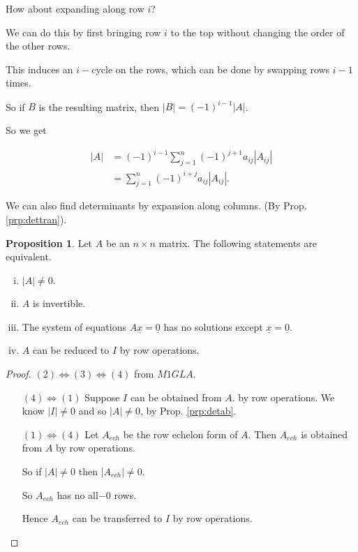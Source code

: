 \documentclass{article}
\theoremstyle{definition} \newtheorem*{definition}{Definition}
\newtheorem{proposition}[theorem]{Proposition}
\begin{document}
   How about expanding along row $i$?

   We can do this by first bringing row $i$ to the top without changing the
   order of the other rows.

   This induces an $i-$cycle on the rows, which can be done by swapping
   rows $i-1$ times.

   So if $B$ is the resulting matrix, then $|B|=(-1)^{i-1}|A|$.

   So we get

   \begin{align*}
     |A| &= (-1)^{i-1} \sum_{j=1}^n (-1)^{j+1} a_{ij} |A_{ij}| \\
     &= \sum_{j=1}^n (-1)^{i+j} a_{ij} |A_{ij}|.
   \end{align*}

   \begin{remark}
     We can also find determinants by expansion along columns. (By Prop.
     \ref{prp:dettran}).\\
   \end{remark}
  
   \begin{proposition}
     Let $A$ be an $n\times n$ matrix.
     The following statements are equivalent. 
     \begin{enumerate}[(i)]
       \item $|A| \neq 0$.
       \item $A$ is invertible.
       \item The system of equations $A\underline{x}=\underline{0}$ has no 
         solutions except $\underline{x}=\underline{0}$.
       \item $A$ can be reduced to $I$ by row operations.
     \end{enumerate}
   \end{proposition}

   \begin{proof}
     $(2) \iff (3) \iff (4)$ from $M1GLA$.
     \begin{itemize}
       \item[$(4) \iff (1)$] Suppose $I$ can be obtained from $A$. by row
         operations. We know $|I|\neq 0$ and so $|A|\neq 0$, by Prop.
         \ref{prp:detab}.

       \item[$(1)\iff (4)$] Let $A_{ech}$ be the row echelon form of $A$.
         Then $A_{ech}$ is obtained from $A$ by row operations.

         So if $|A|\neq 0$ then $|A_{ech}| \neq 0$.

         So $A_{ech}$ has no all$-0$ rows.

         Hence $A_{ech}$ can be transferred to $I$ by row operations.
     \end{itemize}
   \end{proof}
\end{document}

